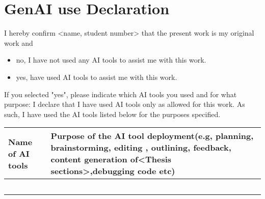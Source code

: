 \documentclass[]{document-classes/mscthesis}
\affiliation{
  \institution{\thesisinstitution}
  \city{\thesiscity}
  \country{\thesiscountry}
}
\begin{document}
\section*{GenAI use Declaration}


I hereby confirm <name, student number> that the present work is my original work and  
\begin{itemize}[label=$\square$]
    \item no, I have not used any AI tools to assist me with this work.
     \item yes, have used AI tools to assist me with this work.
\end{itemize}
If you selected "yes", please indicate which AI tools you used and for what purpose:
I declare that I have used AI tools only as allowed for this work. As such, I have used the AI tools listed below for the purposes specified.

\begin{table}[h]
\centering
\begin{tabular}{|p{}|p{}|}
\hline
\textbf{Name of AI tools} & \textbf{Purpose of the AI tool deployment(e.g, planning, brainstorming, editing , outlining, feedback, content generation of<Thesis sections>,debugging code etc)} \\
\hline
 &  \\
\hline
 &  \\
\hline
 &  \\
\hline
 &  \\
\hline
 &  \\
\hline
\end{tabular}
\end{table}
\end{document}

